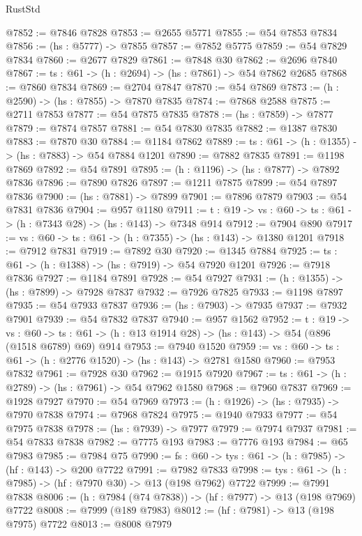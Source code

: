 \begin{lexlean}{RustStd}
\begin{coremodule}
@7852 := @7846 @7828
@7853 := @2655 @5771
@7855 := @54 @7853 @7834
@7856 := (hs : @5777) -> @7855
@7857 := @7852 @5775
@7859 := @54 @7829 @7834
@7860 := @2677 @7829
@7861 := @7848 @30
@7862 := @2696 @7840
@7867 := {ts : @61} -> (h : @2694) -> (hs : @7861) -> @54 @7862 @2685
@7868 := @7860 @7834
@7869 := @2704 @7847
@7870 := @54 @7869
@7873 := (h : @2590) -> (hs : @7855) -> @7870 @7835
@7874 := @7868 @2588
@7875 := @2711 @7853
@7877 := @54 @7875 @7835
@7878 := (hs : @7859) -> @7877
@7879 := @7874 @7857
@7881 := @54 @7830 @7835
@7882 := @1387 @7830
@7883 := @7870 @30
@7884 := @1184 @7862
@7889 := {ts : @61} -> (h : @1355) -> (hs : @7883) -> @54 @7884 @1201
@7890 := @7882 @7835
@7891 := @1198 @7869
@7892 := @54 @7891
@7895 := (h : @1196) -> (hs : @7877) -> @7892 @7836
@7896 := @7890 @7826
@7897 := @1211 @7875
@7899 := @54 @7897 @7836
@7900 := (hs : @7881) -> @7899
@7901 := @7896 @7879
@7903 := @54 @7831 @7836
@7904 := @957 @1180
@7911 := {t : @19} -> {vs : @60} -> {ts : @61} -> (h : @7343 @28) -> (hs : @143) -> @7348 @914
@7912 := @7904 @890
@7917 := {vs : @60} -> {ts : @61} -> (h : @7355) -> (hs : @143) -> @1380 @1201
@7918 := @7912 @7831
@7919 := @7892 @30
@7920 := @1345 @7884
@7925 := {ts : @61} -> (h : @1388) -> (hs : @7919) -> @54 @7920 @1201
@7926 := @7918 @7836
@7927 := @1184 @7891
@7928 := @54 @7927
@7931 := (h : @1355) -> (hs : @7899) -> @7928 @7837
@7932 := @7926 @7825
@7933 := @1198 @7897
@7935 := @54 @7933 @7837
@7936 := (hs : @7903) -> @7935
@7937 := @7932 @7901
@7939 := @54 @7832 @7837
@7940 := @957 @1562
@7952 := {t : @19} ->
  {vs : @60} ->
  {ts : @61} -> (h : @13 @1914 @28) -> (hs : @143) -> @54 (@896 (@1518 @6789) @69) @914
@7953 := @7940 @1520
@7959 := {vs : @60} -> {ts : @61} -> (h : @2776 @1520) -> (hs : @143) -> @2781 @1580
@7960 := @7953 @7832
@7961 := @7928 @30
@7962 := @1915 @7920
@7967 := {ts : @61} -> (h : @2789) -> (hs : @7961) -> @54 @7962 @1580
@7968 := @7960 @7837
@7969 := @1928 @7927
@7970 := @54 @7969
@7973 := (h : @1926) -> (hs : @7935) -> @7970 @7838
@7974 := @7968 @7824
@7975 := @1940 @7933
@7977 := @54 @7975 @7838
@7978 := (hs : @7939) -> @7977
@7979 := @7974 @7937
@7981 := @54 @7833 @7838
@7982 := @7775 @193
@7983 := @7776 @193
@7984 := @65 @7983
@7985 := @7984 @75
@7990 := {fs : @60} -> {tys : @61} -> (h : @7985) -> (hf : @143) -> @200 @7722
@7991 := @7982 @7833
@7998 := {tys : @61} -> (h : @7985) -> (hf : @7970 @30) -> @13 (@198 @7962) @7722
@7999 := @7991 @7838
@8006 := (h : @7984 (@74 @7838)) -> (hf : @7977) -> @13 (@198 @7969) @7722
@8008 := @7999 (@189 @7983)
@8012 := (hf : @7981) -> @13 (@198 @7975) @7722
@8013 := @8008 @7979

\end{coremodule}
\end{lexlean}
